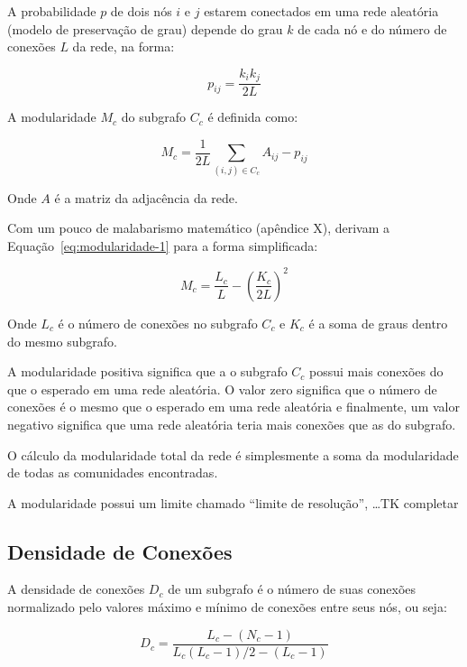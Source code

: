 \documentclass[
  article,
  11pt,
  a4paper,
  english,
  brazil,
  sumario=tradicional]{abntex2}
\begin{document}
A probabilidade $p$ de dois nós $i$ e $j$ estarem conectados em uma rede aleatória (modelo de preservação de grau) depende do grau $k$ de cada nó e do número de conexões $L$ da rede, na forma:

\begin{equation}
p_{ij} = \frac{k_i k_j}{2L}
\end{equation}

A modularidade $M_c$ do subgrafo $C_c$ é definida como:

\begin{equation} \label{eq:modularidade-1}
M_c = \frac{1}{2L} \sum_{(i,j) \in C_c} A_{ij} - p_{ij}
\end{equation}

Onde $A$ é a matriz da adjacência da rede.

Com um pouco de malabarismo matemático (apêndice X),  derivam a Equação~\ref{eq:modularidade-1} para a forma simplificada:

\begin{equation}
M_c = \frac{L_c}{L} - \left( \frac{K_c}{2L} \right)^2
\end{equation}

Onde $L_c$ é o número de conexões no subgrafo $C_c$ e $K_c$ é a soma de graus dentro do mesmo subgrafo.

A modularidade positiva significa que a o subgrafo $C_c$ possui mais conexões do que o esperado em uma rede aleatória. O valor zero significa que o número de conexões é o mesmo que o esperado em uma rede aleatória e finalmente, um valor negativo significa que uma rede aleatória teria mais conexões que as do subgrafo.

O cálculo da modularidade total da rede é simplesmente a soma da modularidade de todas as comunidades encontradas.

A modularidade possui um limite chamado \enquote{limite de resolução}, \ldots TK completar

\subsection{Densidade de Conexões}

A densidade de conexões $D_c$ de um subgrafo é o número de suas conexões normalizado pelo valores máximo e mínimo de conexões entre seus nós, ou seja:

\begin{equation}
D_c = \frac{L_c - (N_c - 1)}{L_c (L_c - 1) / 2 - (L_c - 1)}
\end{equation}
\end{document}
